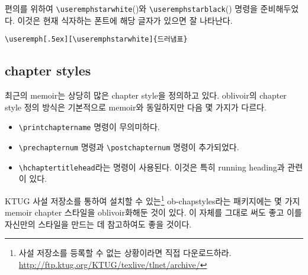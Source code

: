 \documentclass[
	12pt,
	a4paper,
	kosection,
	footnote,
	nobookmarks,
	microtype,
]{oblivoir}
\def\cs#1{\texttt{\textbackslash #1}}
\newcommand\xobclass{x\-ob\-liv\-oir\oblivoirallowbreak}
\newcommand\obclass{ob\-liv\-oir\oblivoirallowbreak}
\def\xetexko{\XeTeX-\ko}
\begin{document}
\medskip

편의를 위하여 \cs{useremphstarwhite}({\useremphstarwhite})와 \cs{useremphstarblack}({\useremphstarblack})
명령을 준비해두었다. 이것은 현재 식자하는 폰트에 해당 글자가 있으면 잘 나타난다.

\medskip

\noindent\begin{minipage}{.7\textwidth}
\begin{verbatim}
\useremph[.5ex][\useremphstarwhite]{드러냄표}
\end{verbatim}
\end{minipage}\hfill
\begin{minipage}{.28\textwidth}
\end{minipage}


\subsection{chapter styles}
최근의 memoir는 상당히 많은 chapter style을 정의하고 있다. oblivoir의 chapter style
정의 방식은 기본적으로 memoir와 동일하지만 다음 몇 가지가 다르다.

\begin{itemize}\tightlist
\item \cs{printchaptername} 명령이 무의미하다.
\item \cs{prechapternum} 명령과 \cs{postchapternum} 명령이 추가되었다.
\item \cs{hchaptertitlehead}라는 명령이 사용된다. 이것은 특히 running heading과 관련이 있다.
\end{itemize}

KTUG 사설 저장소를 통하여 설치할 수 있는\footnote{%
	사설 저장소를 등록할 수 없는 상황이라면 직접 다운로드하라. 
	\url{http://ftp.ktug.org/KTUG/texlive/tlnet/archive/}
}
ob-chapstyles라는 패키지에는 몇 가지 memoir
chapter 스타일을 oblivoir화해둔 것이 있다. 이 자체를 그대로 써도 좋고 이를 자신만의 스타일을
만드는 데 참고하여도 좋을 것이다.
\end{document}
